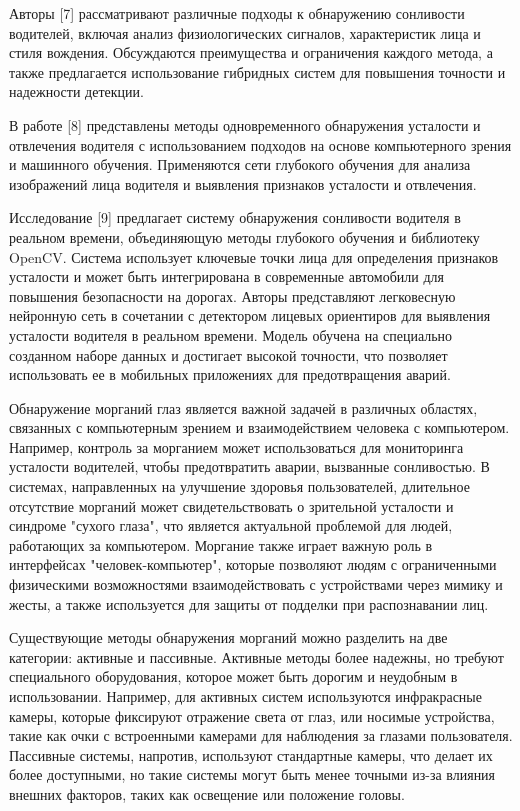 Авторы {[}7{]} рассматривают различные подходы к обнаружению сонливости
водителей, включая анализ физиологических сигналов, характеристик лица и
стиля вождения. Обсуждаются преимущества и ограничения каждого метода, а
также предлагается использование гибридных систем для повышения точности
и надежности детекции.

В работе {[}8{]} представлены методы одновременного обнаружения
усталости и отвлечения водителя с использованием подходов на основе
компьютерного зрения и машинного обучения. Применяются сети глубокого
обучения для анализа изображений лица водителя и выявления признаков
усталости и отвлечения.

Исследование {[}9{]} предлагает систему обнаружения сонливости водителя
в реальном времени, объединяющую методы глубокого обучения и библиотеку
OpenCV. Система использует ключевые точки лица для определения признаков
усталости и может быть интегрирована в современные автомобили для
повышения безопасности на дорогах. Авторы представляют легковесную
нейронную сеть в сочетании с детектором лицевых ориентиров для выявления
усталости водителя в реальном времени. Модель обучена на специально
созданном наборе данных и достигает высокой точности, что позволяет
использовать ее в мобильных приложениях для предотвращения аварий.

Обнаружение морганий глаз является важной задачей в различных областях,
связанных с компьютерным зрением и взаимодействием человека с
компьютером. Например, контроль за морганием может использоваться для
мониторинга усталости водителей, чтобы предотвратить аварии, вызванные
сонливостью. В системах, направленных на улучшение здоровья
пользователей, длительное отсутствие морганий может свидетельствовать о
зрительной усталости и синдроме "сухого глаза", что является актуальной
проблемой для людей, работающих за компьютером. Моргание также играет
важную роль в интерфейсах "человек-компьютер", которые позволяют людям с
ограниченными физическими возможностями взаимодействовать с устройствами
через мимику и жесты, а также используется для защиты от подделки при
распознавании лиц.

Существующие методы обнаружения морганий можно разделить на две
категории: активные и пассивные. Активные методы более надежны, но
требуют специального оборудования, которое может быть дорогим и
неудобным в использовании. Например, для активных систем используются
инфракрасные камеры, которые фиксируют отражение света от глаз, или
носимые устройства, такие как очки с встроенными камерами для наблюдения
за глазами пользователя. Пассивные системы, напротив, используют
стандартные камеры, что делает их более доступными, но такие системы
могут быть менее точными из-за влияния внешних факторов, таких как
освещение или положение головы.

